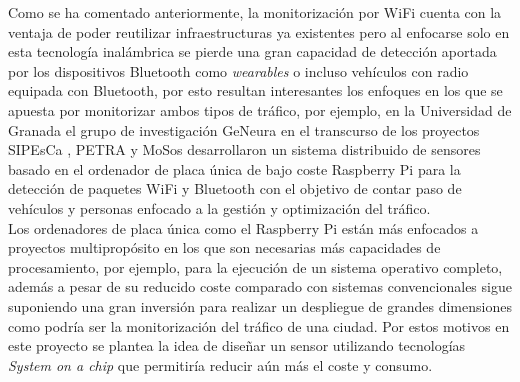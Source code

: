 \documentclass[../proyecto.tex]{subfiles}
\begin{document}
Como se ha comentado anteriormente, la monitorización por WiFi cuenta con la ventaja de poder reutilizar infraestructuras ya existentes pero al enfocarse solo en esta tecnología inalámbrica se pierde una gran capacidad de detección aportada por los dispositivos Bluetooth como \textit{wearables} o incluso vehículos con radio equipada con Bluetooth, por esto resultan interesantes los enfoques en los que se apuesta por monitorizar ambos tipos de tráfico, por ejemplo, en la Universidad de Granada el grupo de investigación GeNeura en el transcurso de los proyectos SIPEsCa \cite{proyecto_sipesca}, PETRA \cite{proyecto_petra} y MoSos \cite{proyecto_mosos} desarrollaron un sistema distribuido de sensores basado en el ordenador de placa única de bajo coste Raspberry Pi para la detección de paquetes WiFi y Bluetooth con el objetivo de contar paso de vehículos y personas enfocado a la gestión y optimización del tráfico.\\

Los ordenadores de placa única como el Raspberry Pi están más enfocados a proyectos multipropósito en los que son necesarias más capacidades de procesamiento, por ejemplo, para la ejecución de un sistema operativo completo, además a pesar de su reducido coste comparado con sistemas convencionales sigue suponiendo una gran inversión para realizar un despliegue de grandes dimensiones como podría ser la monitorización del tráfico de una ciudad. Por estos motivos en este proyecto se plantea la idea de diseñar un sensor utilizando tecnologías  \textit{System on a chip} que permitiría reducir aún más el coste y consumo.\\
\end{document}
